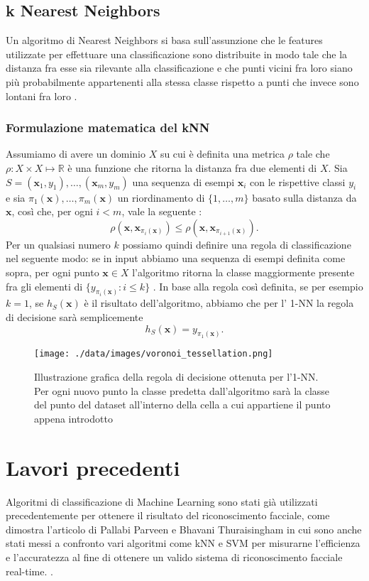 \subsection{k Nearest Neighbors}
Un algoritmo di Nearest Neighbors si basa sull'assunzione che le features utilizzate per effettuare una classificazione sono distribuite in modo tale che la distanza fra esse sia rilevante alla classificazione e che punti vicini fra loro siano più probabilmente appartenenti alla stessa classe rispetto a punti che invece sono lontani fra loro \cite{shalev2014understanding}. 

\subsubsection{Formulazione matematica del kNN} 
Assumiamo di avere un dominio $X$ su cui è definita una metrica $\rho$ tale che $\rho:X\times X \mapsto \mathbb{R}$ è una funzione che ritorna la distanza fra due elementi di $X$. Sia $S=(\pmb{x}_{1},y_{1}),\dots,(\pmb{x}_{m},y_{m})$ una sequenza di esempi $\pmb{x}_{i}$ con le rispettive classi $y_{i}$ e sia $\pi_{1}(\pmb{x}),\dots,\pi_{m}(\pmb{x})$ un riordinamento di $\{1,\dots,m\}$ basato sulla distanza da $\pmb{x}$, così che, per ogni $i<m$, vale la seguente \cite{shalev2014understanding}:
\begin{equation}
	\rho(\pmb{x},\pmb{x}_{\pi_{i}(\pmb{x})}) \le \rho(\pmb{x},\pmb{x}_{\pi_{i+1}(\pmb{x})}).
\end{equation}
Per un qualsiasi numero $k$ possiamo quindi definire una regola di classificazione nel seguente modo: se in input abbiamo una sequenza di esempi definita come sopra, per ogni punto $\pmb{x}\in X$ l'algoritmo ritorna la classe maggiormente presente fra gli elementi di $\{y_{\pi_{i}(\pmb{x})} : i \le k\}$ \cite{shalev2014understanding}. In base alla regola così definita, se per esempio $k=1$, se $h_{S}(\pmb{x})$ è il risultato dell'algoritmo, abbiamo che per l' 1-NN la regola di decisione sarà semplicemente
\begin{equation}
	h_{S}(\pmb{x}) = y_{\pi_{1}(\pmb{x})}.
\end{equation} 
\begin{figure}
	\centering
	\texttt{[image: ./data/images/voronoi\_tessellation.png]}
	\caption{Illustrazione grafica della regola di decisione ottenuta per l'1-NN. Per ogni nuovo punto la classe predetta dall'algoritmo sarà la classe del punto del dataset all'interno della cella a cui appartiene il punto appena introdotto \cite{shalev2014understanding}}
	\label{voronoi}
\end{figure}

\section{Lavori precedenti}
Algoritmi di classificazione di Machine Learning sono stati già utilizzati precedentemente per ottenere il risultato del riconoscimento facciale, come dimostra l'articolo di Pallabi Parveen e Bhavani Thuraisingham in cui sono anche stati messi a confronto vari algoritmi come kNN e SVM per misurarne l'efficienza e l'accuratezza al fine di ottenere un valido sistema di riconoscimento facciale real-time. \cite{parveen2006face}.

